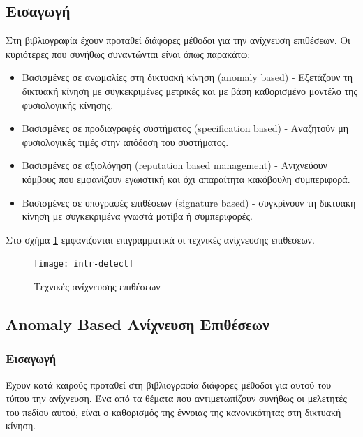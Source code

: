 \documentclass[12pt]{report}
\begin{document}
\subsection{Εισαγωγή}
Στη βιβλιογραφία έχουν προταθεί διάφορες μέθοδοι για την ανίχνευση επιθέσεων. Οι κυριότερες που συνήθως συναντώνται είναι όπως παρακάτω:
\begin{itemize}
  \item Βασισμένες σε ανωμαλίες στη δικτυακή κίνηση (\textlatin{anomaly based}) - Εξετάζουν τη δικτυακή κίνηση με συγκεκριμένες μετρικές και με βάση καθορισμένο μοντέλο της φυσιολογικής κίνησης.
  \item Βασισμένες σε προδιαγραφές συστήματος (\textlatin{specification based}) - Αναζητούν μη φυσιολογικές τιμές στην απόδοση του συστήματος.
  \item Βασισμένες σε αξιολόγηση (\textlatin{reputation based management}) - Ανιχνεύουν κόμβους που εμφανίζουν εγωιστική και όχι απαραίτητα κακόβουλη συμπεριφορά.
  \item Βασισμένες σε υπογραφές επιθέσεων (\textlatin{signature based}) - συγκρίνουν τη δικτυακή κίνηση με συγκεκριμένα γνωστά μοτίβα ή συμπεριφορές.
\end{itemize}
Στο σχήμα \ref{fig:intr-detect} εμφανίζονται επιγραμματικά οι τεχνικές ανίχνευσης επιθέσεων. 
\begin{figure}[ht]
\centering
\texttt{[image: intr-detect]}
\caption{Τεχνικές ανίχνευσης επιθέσεων}
\label{fig:intr-detect}
\end{figure}

\subsection{\textlatin{Anomaly Based} Ανίχνευση Επιθέσεων}
\subsubsection{Εισαγωγή}
Έχουν κατά καιρούς προταθεί στη βιβλιογραφία διάφορες μέθοδοι για αυτού του τύπου την ανίχνευση. Ένα από τα θέματα που αντιμετωπίζουν συνήθως οι μελετητές του πεδίου αυτού, είναι ο καθορισμός της έννοιας της κανονικότητας στη δικτυακή κίνηση.
\end{document}
